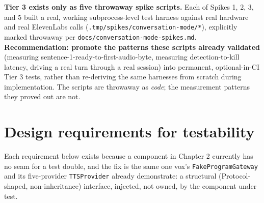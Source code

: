 \documentclass[a4paper,11pt]{report}
\begin{document}
\textbf{Tier 3 exists only as five throwaway spike scripts.} Each of
Spikes 1, 2, 3, and 5 built a real, working subprocess-level test
harness against real hardware and real ElevenLabs calls
(\texttt{.tmp/spikes/conversation-mode/*}), explicitly marked throwaway
per \texttt{docs/conversation-mode-spikes.md}. \textbf{Recommendation:
promote the patterns these scripts already validated} (measuring
sentence-1-ready-to-first-audio-byte, measuring detection-to-kill
latency, driving a real turn through a real session) into permanent,
optional-in-CI Tier 3 tests, rather than re-deriving the same harnesses
from scratch during implementation. The scripts are throwaway as
\emph{code}; the measurement patterns they proved out are not.

\section{Design requirements for testability}
\label{sec:test-di}

Each requirement below exists because a component in Chapter 2 currently
has no seam for a test double, and the fix is the same one vox's
\texttt{FakeProgramGateway} and its five-provider \texttt{TTSProvider}
already demonstrate: a structural (Protocol-shaped, non-inheritance)
interface, injected, not owned, by the component under test.
\end{document}
